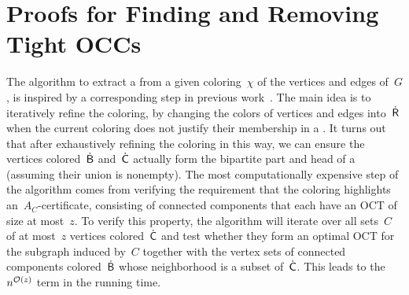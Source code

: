 \section{Proofs for Finding and Removing Tight OCCs} \label{sec:tight:occs-proof}

The algorithm to extract a \zocc from a given coloring~$\chi$ of the vertices and edges of~$G$, is inspired by a corresponding step in previous work~\cite[Lemma 6.2]{DonkersJ24}. The main idea is to iteratively refine the coloring, by changing the colors of vertices and edges into~$\mathsf{\dot{R}}$ when the current coloring does not justify their membership in a \zocc. It turns out that after exhaustively refining the coloring in this way, we can ensure the vertices colored~$\mathsf{\dot{B}}$ and~$\mathsf{\dot{C}}$ actually form the bipartite part and head of a \zocc (assuming their union is nonempty). The most computationally expensive step of the algorithm comes from verifying the requirement that the coloring highlights an~$A_C$-certificate, consisting of connected components that each have an OCT of size at most~$z$. To verify this property, the algorithm will iterate over all sets~$C$ of at most~$z$ vertices colored~$\mathsf{\dot{C}}$ and test whether they form an optimal OCT for the subgraph induced by~$C$ together with the vertex sets of connected components colored~$\mathsf{\dot{B}}$ whose neighborhood is a subset of~$\mathsf{\dot{C}}$. This leads to the~$n^{\mathcal{O}(z)}$ term in the running time.

\lemFindAntlerColored*

